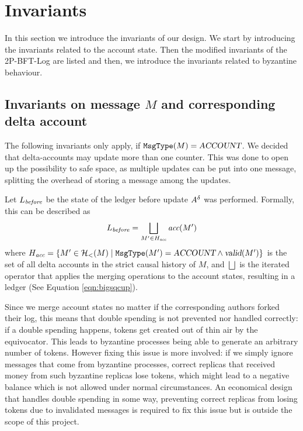 \section{Invariants}
\label{sec:invariants}
In this section we introduce the invariants of our design. We start by introducing the invariants related to the account state. Then the modified invariants of the 2P-BFT-Log are listed and then, we introduce the invariants related to byzantine behaviour.

\subsection{Invariants on message \(M\) and corresponding delta account}
\label{sec:invariants-delta-a}
The following invariants only apply, if $\texttt{MsgType}(M) = \textsl{ACCOUNT}$. We decided that delta-accounts may update more than one counter. This was done to open up the possibility to safe space, as multiple updates can be put into one message, splitting the overhead of storing a message among the updates.

Let $L_\emph{before}$ be the state of the ledger before update $A^\delta$ was performed. Formally, this can be described as
\begin{equation}
    L_\emph{before} = \bigsqcup_{M' \in H_\emph{acc}} \textit{acc}(M')
    \label{eqn:l-before-def}
\end{equation}
where $H_\emph{acc} = \{M' \in \mathcal H_<(M) \mid \texttt{MsgType}(M') = \textsl{ACCOUNT} \land \textsl{valid}(M')\}$ is the set of all delta accounts in the strict causal history of $M$, and $\bigsqcup$ is the iterated operator that applies the merging operations to the account states, resulting in a ledger (See Equation \ref{eqn:bigsqcup}).

Since we merge account states no matter if the corresponding authors forked their log, this means that double spending is not prevented nor handled correctly: if a double spending happens, tokens get created out of thin air by the equivocator. This leads to byzantine processes being able to generate an arbitrary number of tokens. However fixing this issue is more involved: if we simply ignore messages that come from byzantine processes, correct replicas that received money from such byzantine replicas lose tokens, which might lead to a negative balance which is not allowed under normal circumstances. An economical design that handles double spending in some way, preventing correct replicas from losing tokens due to invalidated messages is required to fix this issue but is outside the scope of this project.


